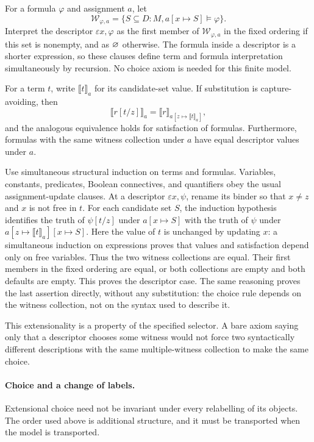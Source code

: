 For a formula $\varphi$ and assignment $a$, let
\[
\mathcal W_{\varphi,a}
 =\{S\subseteq D:M,a[x\mapsto S]\vDash\varphi\}.
\]
Interpret the descriptor $\varepsilon x,\varphi$ as the first member
of $\mathcal W_{\varphi,a}$ in the fixed ordering if this set is
nonempty, and as $\varnothing$ otherwise. The formula inside a
descriptor is a shorter expression, so these clauses define term and
formula interpretation simultaneously by recursion. No choice axiom is
needed for this finite model.

\begin{lemma}
For a term $t$, write $\llbracket t\rrbracket_a$ for its candidate-set
value. If substitution is capture-avoiding, then
\[
\llbracket r[t/z]\rrbracket_a
 =\llbracket r\rrbracket_{a[z\mapsto\llbracket t\rrbracket_a]},
\]
and the analogous equivalence holds for satisfaction of formulas.
Furthermore, formulas with the same witness collection under $a$ have
equal descriptor values under $a$.
\end{lemma}
\Proof
Use simultaneous structural induction on terms and formulas. Variables,
constants, predicates, Boolean connectives, and quantifiers obey the
usual assignment-update clauses. At a descriptor $\varepsilon x,\psi$,
rename its binder so that $x\ne z$ and $x$ is not free in $t$.
For each candidate set $S$, the induction hypothesis identifies the
truth of $\psi[t/z]$ under $a[x\mapsto S]$ with the truth of $\psi$
under $a[z\mapsto\llbracket t\rrbracket_a][x\mapsto S]$.
Here the value of $t$ is unchanged by updating $x$: a simultaneous
induction on expressions proves that values and satisfaction depend
only on free variables. Thus the two witness collections are equal.
Their first members in the fixed ordering are equal, or both collections
are empty and both defaults are empty. This proves the descriptor case.
The same reasoning proves the last assertion directly, without any
substitution: the choice rule depends on the witness collection, not
on the syntax used to describe it.
\Done

This extensionality is a property of the specified selector. A bare
axiom saying only that a descriptor chooses some witness would not force
two syntactically different descriptions with the same multiple-witness
collection to make the same choice.

\paragraph{Choice and a change of labels.}
Extensional choice need not be invariant under every relabelling of its
objects. The order used above is additional structure, and it must be
transported when the model is transported.

